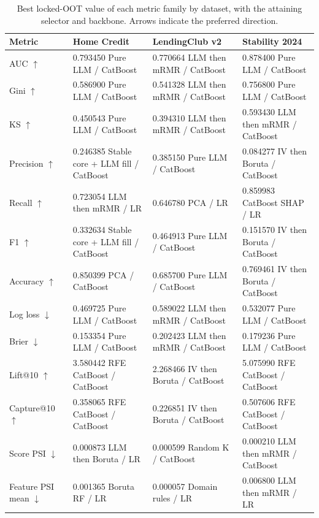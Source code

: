 \documentclass[preprint,12pt]{elsarticle}
\begin{document}
\begin{table}[htbp]
\centering
\scriptsize
\begin{threeparttable}
\caption{Best locked-OOT value of each metric family by dataset, with the attaining selector and backbone. Arrows indicate the preferred direction.}
\label{tab:all_winners}
\begin{tabular}{@{}lL{31mm}L{31mm}L{31mm}@{}}
\toprule
Metric & Home Credit & LendingClub v2 & Stability 2024 \\
\midrule
AUC $\uparrow$ & 0.793450 Pure LLM / CatBoost & 0.770664 LLM then mRMR / CatBoost & 0.878400 Pure LLM / CatBoost \\
Gini $\uparrow$ & 0.586900 Pure LLM / CatBoost & 0.541328 LLM then mRMR / CatBoost & 0.756800 Pure LLM / CatBoost \\
KS $\uparrow$ & 0.450543 Pure LLM / CatBoost & 0.394310 LLM then mRMR / CatBoost & 0.593430 LLM then mRMR / CatBoost \\
Precision $\uparrow$ & 0.246385 Stable core + LLM fill / CatBoost & 0.385150 Pure LLM / CatBoost & 0.084277 IV then Boruta / CatBoost \\
Recall $\uparrow$ & 0.723054 LLM then mRMR / LR & 0.646780 PCA / LR & 0.859983 CatBoost SHAP / LR \\
F1 $\uparrow$ & 0.332634 Stable core + LLM fill / CatBoost & 0.464913 Pure LLM / CatBoost & 0.151570 IV then Boruta / CatBoost \\
Accuracy $\uparrow$ & 0.850399 PCA / CatBoost & 0.685700 Pure LLM / CatBoost & 0.769461 IV then Boruta / CatBoost \\
Log loss $\downarrow$ & 0.469725 Pure LLM / CatBoost & 0.589022 LLM then mRMR / CatBoost & 0.532077 Pure LLM / CatBoost \\
Brier $\downarrow$ & 0.153354 Pure LLM / CatBoost & 0.202423 LLM then mRMR / CatBoost & 0.179236 Pure LLM / CatBoost \\
Lift@10 $\uparrow$ & 3.580442 RFE CatBoost / CatBoost & 2.268466 IV then Boruta / CatBoost & 5.075990 RFE CatBoost / CatBoost \\
Capture@10 $\uparrow$ & 0.358065 RFE CatBoost / CatBoost & 0.226851 IV then Boruta / CatBoost & 0.507606 RFE CatBoost / CatBoost \\
Score PSI $\downarrow$ & 0.000873 LLM then Boruta / LR & 0.000599 Random K / CatBoost & 0.000210 LLM then mRMR / CatBoost \\
Feature PSI mean $\downarrow$ & 0.001365 Boruta RF / LR & 0.000057 Domain rules / LR & 0.006800 LLM then mRMR / LR \\

\end{tabular}
\end{threeparttable}
\end{table}
\end{document}
